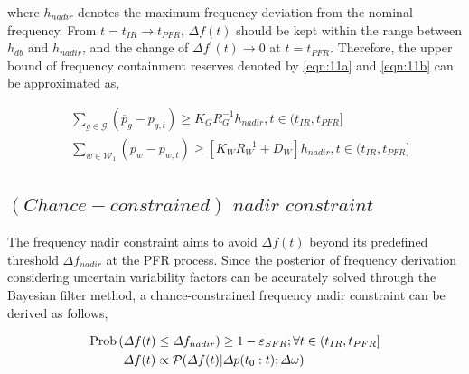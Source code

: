 \documentclass[lettersize,journal]{IEEEtran}
\begin{document}
\noindent where \(h_{nadir}\) denotes the maximum frequency deviation from the nominal frequency. From \(t \!=\! t_{IR}\!\rightarrow\! t_{PFR}\), \(\varDelta f(t)\) should be kept within the range between \(h_{db}\) and \(h_{nadir}\), and the change of \(\varDelta f^{'}(t)\! \rightarrow\! 0\) at \(t=t_{PFR}\). Therefore, the upper bound of frequency containment reserves denoted by \eqref{eqn:11a} and \eqref{eqn:11b} can be approximated as,

\vspace{-0.125in}
\begin{newsubequations}
	\label{eqn:12}
	\begin{align}
		 & \sum\nolimits_{g\in\mathcal{G}} \left( \overline{p}_{g} -p_{g, t}\right) \geq{K_{G} }{ R_{G}^{-1}} h_{nadir}, t \in (t_{IR}, t_{PFR}] \label {eqn:12a} \\
		 & \sum\nolimits_{w\in\mathcal{W}_{1}} \left( \overline{p}_{w} - p_{w, t} \right) \geq [K_{W}R_{W}^{-1} + D_{W}] h_{nadir}, t \in (t_{IR}, t_{PFR}] \label{eqn:12b}
	\end{align}
\end{newsubequations}

\vspace{-0.2in} 
\subsection{$(Chance-constrained)\,\, nadir \,\,constraint$}


The frequency nadir constraint aims to avoid \(\varDelta f(t)\)  beyond its predefined threshold \(\varDelta f_{nadir}\) at the PFR process.  Since the posterior of frequency derivation considering
uncertain variability factors can be accurately solved through the Bayesian filter method, a chance-constrained frequency nadir constraint can be derived as follows,

\vspace{-0.125in} \begin{small} \begin{align}\label{eqn:13} & \textrm{Prob}\left(\varDelta f(t) \leq \varDelta f_{nadir}\right) \geq 1-\varepsilon_{SFR};\forall t\in(t_{IR}, t_{PFR}] \notag \\
& \qquad\,\,\,\, \varDelta f(t) \propto \mathcal{P}(\varDelta f(t)|\varDelta p(t_0:t); \varDelta \omega) \end{align} \end{small}
\end{document}
